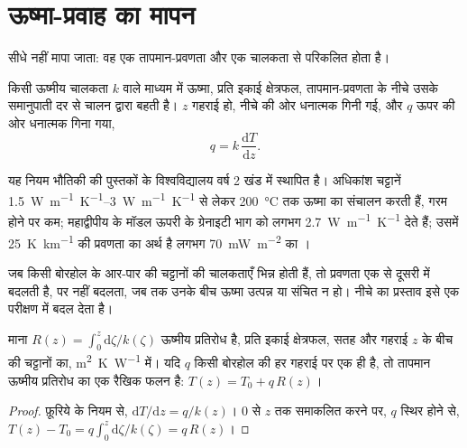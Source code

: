 \section{ऊष्मा-प्रवाह का मापन}

 सीधे नहीं मापा जाता: वह एक तापमान-प्रवणता और एक चालकता से परिकलित होता है।

\begin{proposition}[फ़ूरिये का नियम]\label{prop:b1:heat-budget:fourier}
किसी ऊष्मीय चालकता $k$ वाले माध्यम में ऊष्मा, प्रति इकाई क्षेत्रफल, तापमान-प्रवणता के नीचे उसके समानुपाती दर से चालन द्वारा बहती है। $z$ गहराई हो, नीचे की ओर धनात्मक गिनी गई, और $q$ ऊपर की ओर धनात्मक गिना गया,
\[
  q = k\,\frac{\mathrm dT}{\mathrm dz} .
\]
\end{proposition}
\admitted

यह नियम भौतिकी की पुस्तकों के विश्वविद्यालय वर्ष 2 खंड में स्थापित है। अधिकांश चट्टानें \qtyrange{1.5}{3}{W.m^{-1}.K^{-1}} से लेकर \qty{200}{\celsius} तक ऊष्मा का संचालन करती हैं, गरम होने पर कम; महाद्वीपीय  के मॉडल ऊपरी  के ग्रेनाइटी भाग को लगभग \qty{2.7}{W.m^{-1}.K^{-1}} देते हैं;
उसमें \qty{25}{K.km^{-1}} की प्रवणता का अर्थ है लगभग \qty{70}{mW.m^{-2}} का ।

जब किसी बोरहोल के आर-पार की चट्टानों की चालकताएँ भिन्न होती हैं, तो प्रवणता एक से दूसरी में बदलती है, पर  नहीं बदलता, जब तक उनके बीच ऊष्मा उत्पन्न या संचित न हो। नीचे का प्रस्ताव इसे एक परीक्षण में बदल देता है।

\begin{proposition}[बुलार्ड आलेख]\label{prop:b1:heat-budget:bullard}
माना $R(z) = \int_0^z \mathrm d\zeta/k(\zeta)$ ऊष्मीय प्रतिरोध है, प्रति इकाई क्षेत्रफल, सतह और गहराई $z$ के बीच की चट्टानों का, \unit{m^2.K.W^{-1}} में। यदि  $q$ किसी बोरहोल की हर गहराई पर एक ही है, तो तापमान ऊष्मीय प्रतिरोध का एक रैखिक फलन है: $T(z) = T_0 + q\,R(z)$।
\end{proposition}

\begin{proof}
फ़ूरिये के नियम से, $\mathrm dT/\mathrm dz = q/k(z)$। $0$ से $z$ तक समाकलित करने पर, $q$ स्थिर होने से, $T(z) - T_0 = q\int_0^z \mathrm d\zeta/k(\zeta) = q\,R(z)$।
\end{proof}


